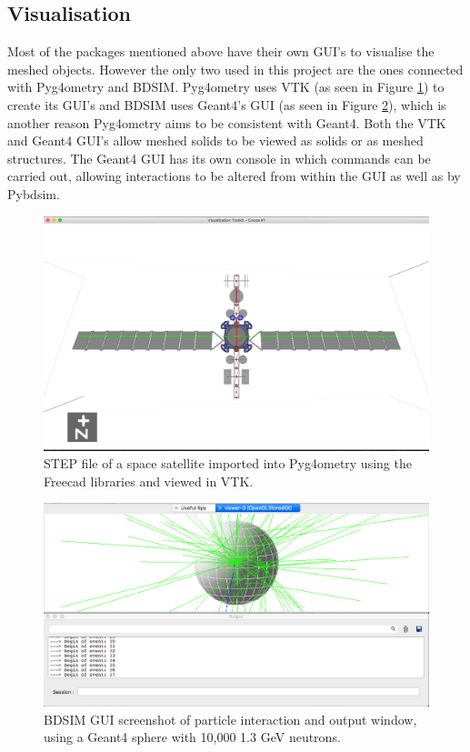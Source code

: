 \documentclass[12pt,a4paper]{article}
\begin{document}
\subsection{Visualisation}
Most of the packages mentioned above have their own GUI's to visualise the meshed objects. However the only two used in this project are the ones connected with Pyg4ometry and BDSIM. Pyg4ometry uses VTK (as seen in Figure \ref{sat}) to create its GUI's and BDSIM uses Geant4's GUI (as seen in Figure \ref{screengrab}), which is another reason Pyg4ometry aims to be consistent with Geant4. Both the VTK and Geant4 GUI's allow meshed solids to be viewed as solids or as meshed structures. The Geant4 GUI has its own console in which commands can be carried out, allowing interactions to be altered from within the GUI as well as by Pybdsim.

\begin{figure}[h!]
\centering
\includegraphics[scale=0.4]{Images//VTK/sat.png}
\caption[width=\columnwidth]{STEP file of a space satellite imported into Pyg4ometry using the Freecad libraries and viewed in VTK.}
\label{sat}
\end{figure}

\begin{figure}[h!]
\centering
\includegraphics[scale=0.4]{Images//BDSIM//screengrab.png}
\caption[width=\columnwidth]{BDSIM GUI screenshot of particle interaction and output window, using a Geant4 sphere with 10,000 1.3 GeV neutrons.}
\label{screengrab}
\end{figure}
\end{document}
